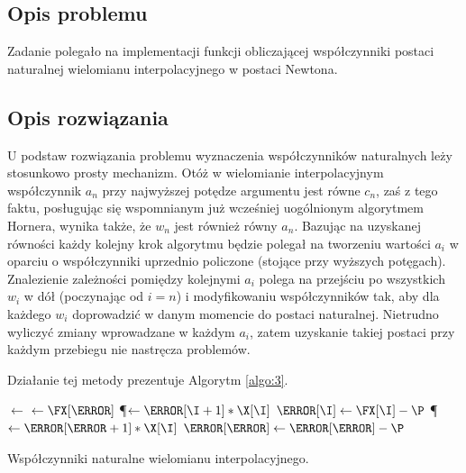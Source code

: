 \documentclass{classrep}
\begin{document}
	\subsection{Opis problemu}
		Zadanie polegało na implementacji funkcji obliczającej współczynniki postaci naturalnej wielomianu interpolacyjnego w postaci Newtona.
				
	\subsection{Opis rozwiązania}
		U podstaw rozwiązania problemu wyznaczenia współczynników naturalnych leży stosunkowo prosty mechanizm. Otóż w wielomianie interpolacyjnym współczynnik $a_n$ przy najwyższej potędze argumentu jest równe $c_n$, zaś z tego faktu, posługując się wspomnianym już wcześniej uogólnionym algorytmem Hornera, wynika także, że $w_n$ jest również równy $a_n$. Bazując na uzyskanej równości każdy kolejny krok algorytmu będzie polegał na tworzeniu wartości $a_i$ w oparciu o współczynniki uprzednio policzone (stojące przy wyższych potęgach). 
		Znalezienie zależności pomiędzy kolejnymi $a_i$ polega na przejściu po wszystkich $w_i$ w dół (poczynając od $i = n$) i modyfikowaniu współczynników tak, aby dla każdego $w_i$ doprowadzić w danym momencie do postaci naturalnej. Nietrudno wyliczyć zmiany wprowadzane w każdym $a_i$, zatem uzyskanie takiej postaci przy każdym przebiegu nie nastręcza problemów. 
		
		Działanie tej metody prezentuje Algorytm \ref{algo:3}.
	
		\begin{algorithm}[!htbp]
			

		    	\Fun{\F{\X, \FX}} {
		    		\N $\gets$ \LEN{\FX}\;
		    		\A[\N] $\gets \FX[\N]$\;
		    		 {
		    			\P $\gets \A[\I+1] * \X[\I]$\;
		    			$\A[\I] \gets \FX[\I] - \P$\; 
		    			 {
		    				\P $\gets \A[\J+1] * \X[\I]$\;
		    				$\A[\J] \gets \A[\J] - \P$\; 	
					}	
		    		}
		    		\KwRet \A\;
    			}

    			\caption{Współczynniki naturalne wielomianu interpolacyjnego.}
    			\label{algo:3}
		\end{algorithm}	
				
\end{document}
